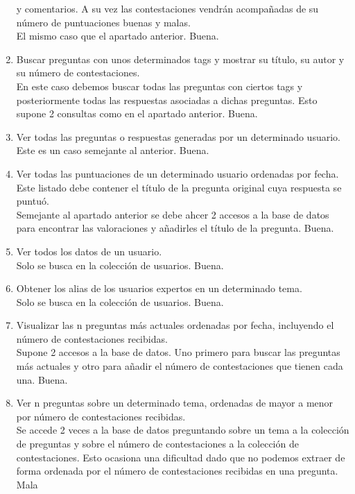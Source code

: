 \documentclass{article}
\begin{document}
\begin{enumerate}
      y comentarios. A su vez las contestaciones vendrán acompañadas de su
      número de puntuaciones buenas y malas. \\
      El mismo caso que el apartado anterior. Buena.
      \item Buscar preguntas con unos determinados tags y mostrar su título, su autor
      y su número de contestaciones. \\
      En este caso debemos buscar todas las preguntas con ciertos tags y posteriormente
      todas las respuestas asociadas a dichas preguntas. Esto supone 2 consultas como 
      en el apartado anterior. Buena.
      \item Ver todas las preguntas o respuestas generadas por un determinado usuario. \\
      Este es un caso semejante al anterior. Buena.
      \item Ver todas las puntuaciones de un determinado usuario ordenadas por fecha.
      Este listado debe contener el título de la pregunta original cuya respuesta
      se puntuó. \\
      Semejante al apartado anterior se debe ahcer 2 accesos a la base de datos para 
      encontrar las valoraciones y añadirles el título de la pregunta. Buena.
      \item Ver todos los datos de un usuario.\\
      Solo se busca en la colección de usuarios. Buena.
      \item Obtener los alias de los usuarios expertos en un determinado tema.\\
      Solo se busca en la colección de usuarios. Buena.
      \item Visualizar las n preguntas más actuales ordenadas por fecha, incluyendo
      el número de contestaciones recibidas.\\
      Supone 2 accesos a la base de datos. Uno primero para buscar las preguntas más actuales
      y otro para añadir el número de contestaciones que tienen cada una. Buena.
      \item Ver n preguntas sobre un determinado tema, ordenadas de mayor a menor
      por número de contestaciones recibidas.\\
      Se accede 2 veces a la base de datos preguntando sobre un tema a la colección de
      preguntas y sobre el número de contestaciones a la colección de contestaciones. Esto 
      ocasiona una dificultad dado que no podemos extraer de forma ordenada por el número de
      contestaciones recibidas en una pregunta. Mala
    \end{enumerate}

    
\end{document}
